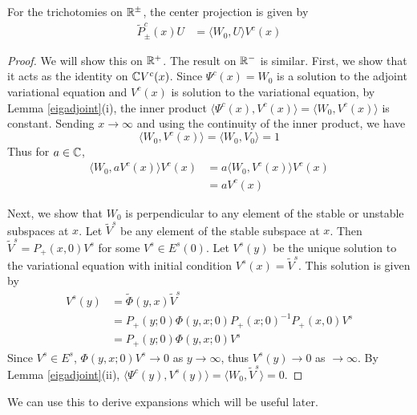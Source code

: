 \documentclass[thesis.tex]{subfiles}
\begin{document}
\begin{lemma}\label{centerprojlemma}
For the trichotomies on $\mathbb{R}^\pm$, the center projection is given by 
\begin{align}
\tilde{P}^c_\pm(x) U &= \langle W_0, U \rangle V^c(x)
\end{align}
\begin{proof}
We will show this on $\mathbb{R}^+$. The result on $\mathbb{R}^-$ is similar. First, we show that it acts as the identity on $\mathbb{C} V^c(x)$. Since $\Psi^c(x) = W_0$ is a solution to the adjoint variational equation and $V^c(x)$ is solution to the variational equation, by Lemma \ref{eigadjoint}(i), the inner product $\langle \Psi^c(x), V^c(x) \rangle = \langle W_0, V^c(x) \rangle$ is constant. Sending $x \rightarrow \infty$ and using the continuity of the inner product, we have
\[
\langle W_0, V^c(x) \rangle = \langle W_0, V_0 \rangle = 1
\]
Thus for $a \in \mathbb{C}$,
\begin{align*}
\langle W_0, a V^c(x) \rangle V^c(x) 
&= a \langle W_0, V^c(x) \rangle V^c(x) \\
&= a V^c(x)
\end{align*}

Next, we show that $W_0$ is perpendicular to any element of the stable or unstable subspaces at $x$. Let $\tilde{V}^s$ be any element of the stable subspace at $x$. Then $\tilde{V}^s = P_+(x, 0) V^s$ for some $V^s \in E^s(0)$. Let $V^s(y)$ be the unique solution to the variational equation with initial condition $V^s(x) = \tilde{V}^s$. This solution is given by
\begin{align*}
V^s(y) &= \tilde{\Phi}(y,x)\tilde{V}^s \\
&= P_+(y; 0) \Phi(y, x; 0) P_+(x; 0)^{-1} P_+(x, 0) V^s \\
&= P_+(y; 0) \Phi(y, x; 0) V^s
\end{align*}
Since $V^s \in E^s$, $\Phi(y, x; 0) V^s \rightarrow 0$ as $y \rightarrow \infty$, thus $V^s(y) \rightarrow 0$ as $ \rightarrow \infty$. By Lemma \ref{eigadjoint}(ii), $\langle \Psi^c(y), V^s(y) \rangle = \langle W_0, \tilde{V}^s \rangle = 0$.
\end{proof}
\end{lemma}

We can use this to derive expansions which will be useful later.
\end{document}
